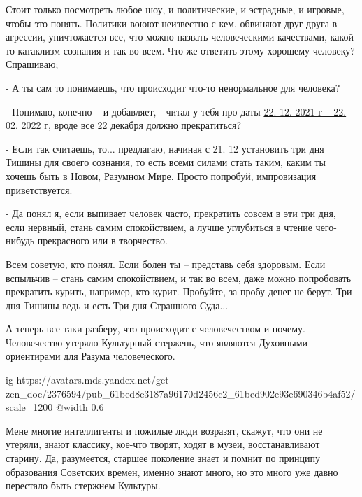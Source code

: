 Стоит только посмотреть любое шоу, и политические, и эстрадные, и игровые,
чтобы это понять. Политики воюют неизвестно с кем, обвиняют друг друга в
агрессии, уничтожается все, что можно назвать человеческими качествами,
какой-то катаклизм сознания и так во всем. Что же ответить этому хорошему
человеку? Спрашиваю;

- А ты сам то понимаешь, что происходит что-то ненормальное для человека?

- Понимаю, конечно – и добавляет, - читал у тебя про даты
\href{https://zen.yandex.ru/media/vestnikviktor/predskazyvaem-griaduscee--dve-daty-22-12-2021-g--22-02-2022-g-61bc22d0e93e69034678e6c6}{22. 12. 2021 г – 22. 02. 2022 г}, вроде все 22 декабря должно прекратиться?

- Если так считаешь, то... предлагаю, начиная с 21. 12 установить три дня Тишины
для своего сознания, то есть всеми силами стать таким, каким ты хочешь быть в
Новом, Разумном Мире. Просто попробуй, импровизация приветствуется.

- Да понял я, если выпивает человек часто, прекратить совсем в эти три дня,
если нервный, стань самим спокойствием, а лучше углубиться в чтение чего-нибудь
прекрасного или в творчество.

\begin{zznagolos}
Всем советую, кто понял. Если болен ты – представь себя здоровым. Если
вспыльчив – стань самим спокойствием, и так во всем, даже можно попробовать
прекратить курить, например, кто курит. Пробуйте, за пробу денег не берут. Три
дня Тишины ведь и есть Три дня Страшного Суда...	
\end{zznagolos}

А теперь все-таки разберу, что происходит с человечеством и почему.
Человечество утеряло Культурный стержень, что являются Духовными ориентирами
для Разума человеческого. 

\begin{center}
\ifcmt
  ig https://avatars.mds.yandex.net/get-zen_doc/2376594/pub_61bed8e3187a96170d2456c2_61bed902e93e690346b4af52/scale_1200
  @width 0.6
\fi

\end{center}


Мене многие интеллигенты и пожилые люди возразят, скажут, что они не утеряли,
знают классику, кое-что творят, ходят в музеи, восстанавливают старину. Да,
разумеется, старшее поколение знает и помнит по принципу образования Советских
времен, именно знают много, но это много уже давно перестало быть стержнем
Культуры.

